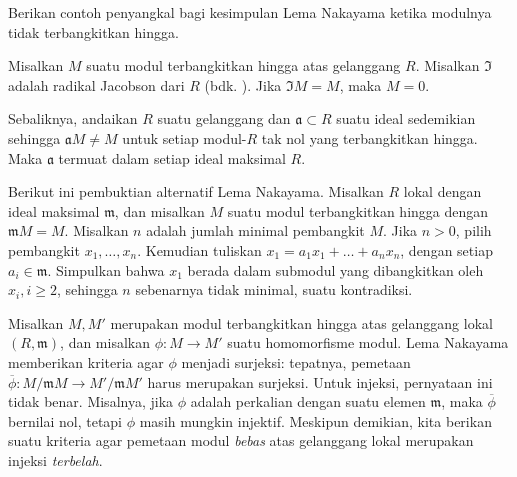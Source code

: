 \begin{exercise}
Berikan contoh penyangkal bagi kesimpulan Lema Nakayama ketika modulnya
tidak terbangkitkan hingga.
\end{exercise}
\begin{exercise}
Misalkan $M$ suatu modul terbangkitkan hingga atas gelanggang $R$. Misalkan $\mathfrak{I}$
adalah radikal Jacobson
dari $R$ (bdk. ). Jika $\mathfrak{I} M = M$,
maka $M =
0$.
\end{exercise}

\begin{exercise}
Sebaliknya, andaikan $R$ suatu gelanggang dan $\mathfrak{a} \subset R$ suatu ideal
sedemikian sehingga $\mathfrak{a} M \neq M$ untuk setiap modul-$R$ tak nol yang terbangkitkan
hingga. Maka $\mathfrak{a}$ termuat dalam setiap ideal maksimal $R$.
\end{exercise}


\begin{exercise}
Berikut ini pembuktian alternatif Lema Nakayama. Misalkan $R$ lokal dengan
ideal maksimal $\mathfrak{m}$, dan misalkan $M$ suatu modul terbangkitkan hingga dengan
$\mathfrak{m}M = M$. Misalkan $n$ adalah jumlah minimal pembangkit $M$. Jika
$n>0$, pilih pembangkit $x_1, \dots, x_n$. Kemudian tuliskan $x_1 = a_1 x_1 + \dots +
a_n x_n$, dengan setiap $a_i \in \mathfrak{m}$. Simpulkan bahwa $x_1$ berada dalam
submodul yang dibangkitkan oleh $x_i, i \geq 2$, sehingga $n$ sebenarnya tidak
minimal, suatu kontradiksi.
\end{exercise}

Misalkan $M, M'$ merupakan modul terbangkitkan hingga atas gelanggang lokal $(R,
\mathfrak{m})$, dan misalkan $\phi: M \to M'$ suatu homomorfisme modul. Lema
Nakayama memberikan kriteria agar $\phi$ menjadi surjeksi: tepatnya, pemetaan
$\overline{\phi}: M/\mathfrak{m}M \to M'/\mathfrak{m}M'$ harus merupakan surjeksi.
Untuk injeksi, pernyataan ini tidak benar. Misalnya, jika $\phi$ adalah perkalian dengan suatu elemen
$\mathfrak{m}$, maka $\overline{\phi}$ bernilai nol, tetapi $\phi$ masih mungkin injektif.
Meskipun demikian, kita berikan suatu kriteria agar pemetaan modul \emph{bebas} atas gelanggang lokal
merupakan injeksi \emph{terbelah}.

